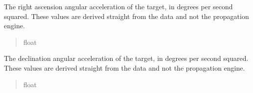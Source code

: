 \documentclass[letterpaper,11pt,english]{sphinxmanual}
\begin{document}
\begin{savenotes}
\begin{fulllineitems}
\begin{savenotes}\begin{fulllineitems}
\label{\detokenize{code/opihiexarata.propagate.solution:opihiexarata.propagate.solution.PropagativeSolution.raw_ra_acceleration}}
\pysigstartsignatures
{}
\pysigstopsignatures
\sphinxAtStartPar
The right ascension angular acceleration of the target, in degrees per
second squared. These values are derived straight from the data and
not the propagation engine.
\begin{quote}\begin{description}
\sphinxAtStartPar
float

\end{description}\end{quote}

\end{fulllineitems}\end{savenotes}


\begin{savenotes}\begin{fulllineitems}
\label{\detokenize{code/opihiexarata.propagate.solution:opihiexarata.propagate.solution.PropagativeSolution.raw_dec_acceleration}}
\pysigstartsignatures
{}
\pysigstopsignatures
\sphinxAtStartPar
The declination angular acceleration of the target, in degrees per
second squared. These values are derived straight from the data
and not the propagation engine.
\begin{quote}\begin{description}
\sphinxAtStartPar
float

\end{description}\end{quote}

\end{fulllineitems}\end{savenotes}



\end{fulllineitems}
\end{savenotes}
\end{document}
